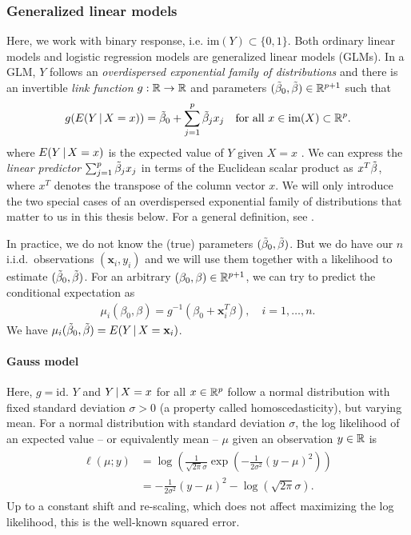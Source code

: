 \subsubsection{Generalized linear models}\label{subsubsec:glm}

Here, we work with binary response, i.e. $\mathrm{im}(Y) \subset \{0, 1\}$. Both ordinary 
linear models and logistic regression models are generalized linear models (GLMs). In 
a GLM, $Y$ follows an \textit{overdispersed exponential family of distributions} and there is an 
invertible \textit{link function}
$g: \mathbb{R} \to \mathbb{R}$ and parameters $(\tilde{\beta}_0, \tilde{\beta}) \in \mathbb{R}^{p+1}$ such that
\begin{align}
    g(E(Y \,|\, X = x)) = \tilde{\beta}_0 + \sum_{j=1}^p \tilde{\beta}_j x_j \quad 
    \text{for all } x \in \mathrm{im}(X) \subset \mathbb{R}^p.
\end{align}
where $E(Y \,|\, X = x)$ is the expected value of $Y$ given $X = x$ \cite{glm72}. We can express the 
\textit{linear predictor} $\sum_{j=1}^p \tilde{\beta}_j x_j$ in terms of the Euclidean scalar product 
as $x^T \tilde{\beta}$, where $x^T$ denotes the transpose of the column vector $x$. We will only introduce 
the two special cases of an overdispersed exponential family of distributions that matter to us in 
this thesis below. For a general definition, see \cite[section 1.1]{glm72}.

In practice, we do not know the (true) parameters
$(\tilde{\beta}_0, \tilde{\beta})$. But we do have our $n$ i.i.d.\ observations $(\mathbf{x}_i, y_i)$
and we will use them together with a likelihood to estimate $(\tilde{\beta}_0, \tilde{\beta})$. For an 
arbitrary $(\beta_0, \beta) \in \mathbb{R}^{p+1}$, we can try to predict the conditional expectation as
\begin{align}\label{eq:glm-mu}
    \mu_i(\beta_0, \beta) = g^{-1}(\beta_0 + \mathbf{x}_i^T \beta), \quad i = 1, \ldots, n.
\end{align}
We have $\mu_i(\tilde{\beta}_0, \tilde{\beta}) = E(Y \,|\, X = \mathbf{x}_i)$.

\paragraph{Gauss model}
Here, $g = \text{id}$. $Y$ and $Y \,|\, X = x$ for all $x \in \mathbb{R}^p$ follow a normal
distribution with fixed standard deviation $\sigma > 0$ (a property called homoscedasticity), but 
varying mean. For a normal distribution with standard deviation $\sigma$, the log likelihood of an 
expected value -- or equivalently mean -- $\mu$ given an observation $y \in \mathbb{R}$ is
\begin{align}
\begin{split}
    \ell(\mu; y) &= \log\left( \frac{1}{\sqrt{2\pi}\sigma} 
        \exp \left( -\frac{1}{2\sigma^2}(y - \mu)^2 \right) \right) \\
    &= -\frac{1}{2\sigma^2}(y - \mu)^2 - \log \left( \sqrt{2\pi}\sigma \right).
\end{split}
\end{align}
Up to a constant shift and re-scaling, which does not affect maximizing the log likelihood, this
is the well-known squared error.

